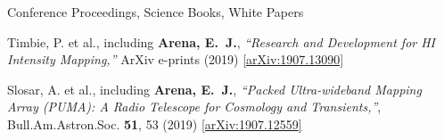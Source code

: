 \documentclass{resume} %
\begin{document}
\begin{rSection}{Conference Proceedings, Science Books, White Papers}

\begin{etaremune}

\item {Timbie}, P. et al., including \textbf{{Arena}, E.~J.},
         \textit{``Research and Development for HI Intensity Mapping,''} ArXiv e-prints (2019) \href{https://arxiv.org/abs/1907.13090}{[arXiv:1907.13090]}

\item {Slosar}, A. et al., including \textbf{{Arena}, E.~J.},
\textit{``Packed Ultra-wideband Mapping Array (PUMA): A Radio Telescope for Cosmology and Transients,''}, Bull.Am.Astron.Soc. \textbf{51}, 53 (2019)  \href{https://arxiv.org/abs/1907.12559}{[arXiv:1907.12559]}


\end{etaremune}
\end{rSection}
\end{document}
